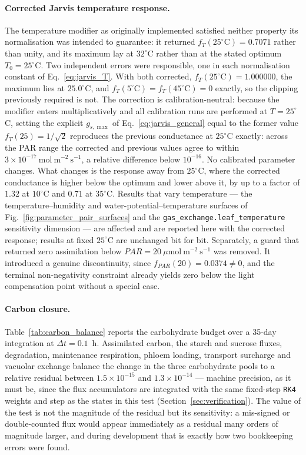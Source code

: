 \documentclass[a4paper,fleqn]{cas-sc}
\begin{document}
\paragraph{Corrected Jarvis temperature response.}
The temperature modifier as originally implemented satisfied neither property
its normalisation was intended to guarantee: it returned
$f_T(25^{\circ}\mathrm{C}) = 0.7071$ rather than unity, and its maximum lay
at $32^{\circ}$C rather than at the stated optimum $T_0 = 25^{\circ}$C. Two
independent errors were responsible, one in each normalisation constant of
Eq.~\eqref{eq:jarvis_T}. With both corrected, $f_T(25^{\circ}\mathrm{C}) =
1.000000$, the maximum lies at $25.0^{\circ}$C, and
$f_T(5^{\circ}\mathrm{C}) = f_T(45^{\circ}\mathrm{C}) = 0$ exactly, so the
clipping previously required is not. The correction is calibration-neutral:
because the modifier enters multiplicatively and all calibration runs are
performed at $T = 25^{\circ}$C, setting the explicit $g_{s,\max}$ of
Eq.~\eqref{eq:jarvis_general} equal to the former value $f_T(25)=1/\sqrt{2}$
reproduces the previous conductance at $25^{\circ}$C exactly: across the PAR
range the corrected and previous values agree to within
$3\times10^{-17}\ \mathrm{mol\ m^{-2}\ s^{-1}}$, a relative difference below
$10^{-16}$. No calibrated parameter changes. What changes is
the response away from $25^{\circ}$C, where the corrected conductance is
higher below the optimum and lower above it, by up to a factor of $1.32$ at
$10^{\circ}$C and $0.71$ at $35^{\circ}$C. Results that vary temperature ---
the temperature--humidity and water-potential--temperature surfaces of
Fig.~\ref{fig:parameter_pair_surfaces} and the
\texttt{gas\_exchange.leaf\_temperature} sensitivity dimension --- are
affected and are reported here with the corrected response; results at fixed
$25^{\circ}$C are unchanged bit for bit. Separately, a guard that returned
zero assimilation below $\mathit{PAR} = 20\ \mu\mathrm{mol\ m^{-2}\ s^{-1}}$
was removed. It introduced a genuine discontinuity, since
$f_{\mathit{PAR}}(20) = 0.0374 \neq 0$, and the terminal non-negativity
constraint already yields zero below the light compensation point without a
special case.

\paragraph{Carbon closure.}
Table~\ref{tab:carbon_balance} reports the carbohydrate budget over a 35-day
integration at $\Delta t = 0.1$~h. Assimilated carbon, the starch and sucrose
fluxes, degradation, maintenance respiration, phloem loading, transport
surcharge and vacuolar exchange balance the change in the three
carbohydrate pools to a relative residual between
$1.5\times10^{-15}$ and $1.3\times10^{-14}$ --- machine precision, as it must
be, since the flux accumulators are integrated with the same fixed-step
\texttt{RK4} weights and step as the states in this test
(Section~\ref{sec:verification}). The value of the test is not the
magnitude of the residual but its sensitivity: a mis-signed or double-counted
flux would appear immediately as a residual many orders of magnitude larger,
and during development that is exactly how two bookkeeping errors were found.
\end{document}
